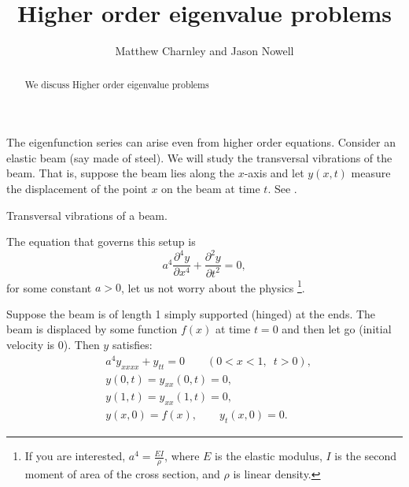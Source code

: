 \documentclass{ximera}
\title{Higher order eigenvalue problems}
\author{Matthew Charnley and Jason Nowell}
\begin{document}
\begin{abstract}
    We discuss Higher order eigenvalue problems
\end{abstract}
\maketitle

\label{sec:appeig}

%

The eigenfunction series can arise even from higher order equations. Consider an elastic beam (say made of steel).  We will study the transversal vibrations of the beam.  That is, suppose the beam lies along the $x$-axis and let $y(x,t)$ measure the displacement of the point $x$ on the beam at time $t$.  See .

\begin{myfig}
    \capstart
    
    \caption{Transversal vibrations of a beam.\label{appeig:transbeamfig}}
\end{myfig}

The equation that governs this setup is
\begin{equation*}
    a^4 \frac{\partial^4 y}{\partial x^4} + \frac{\partial^2 y}{\partial t^2} = 0,
\end{equation*}
for some constant $a > 0$, let us not worry about the physics%
\footnote{%
    If you are interested, $a^4 = \frac{EI}{\rho}$, where $E$ is the elastic modulus, $I$ is the second moment of area of the cross section, and $\rho$ is linear density.%
    }.%

Suppose the beam is of length 1 simply supported (hinged) at the ends. The beam is displaced by some function $f(x)$ at time $t=0$ and then let go (initial velocity is 0).  Then $y$ satisfies:
\begin{equation} 
    \label{appeig:beameq}
    \begin{aligned}
        & a^4 y_{xxxx} + y_{tt} = 0 \qquad (0 < x < 1, \enspace t > 0), \\
        & y(0,t) = y_{xx}(0,t) = 0 , \\
        & y(1,t) = y_{xx}(1,t) = 0 , \\
        & y(x,0) = f(x), \qquad y_{t}(x,0) = 0 .
    \end{aligned}
\end{equation}
\end{document}
